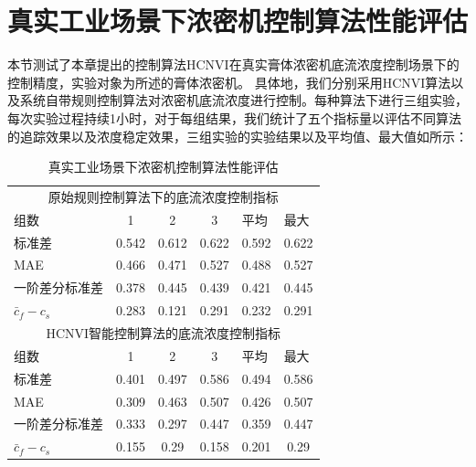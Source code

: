 \section{真实工业场景下浓密机控制算法性能评估}
本节测试了本章提出的控制算法HCNVI在真实膏体浓密机底流浓度控制场景下的控制精度，实验对象为所述的膏体浓密机。
具体地，我们分别采用HCNVI算法以及系统自带规则控制算法对浓密机底流浓度进行控制。每种算法下进行三组实验，每次实验过程持续1小时，对于每组结果，我们统计了五个指标量以评估不同算法的追踪效果以及浓度稳定效果，三组实验的实验结果以及平均值、最大值如所示：
\begin{table}[htb]
  \centering
  \caption{真实工业场景下浓密机控制算法性能评估}
    \begin{tabular}{lccccc}
    \toprule
    \multicolumn{6}{c}{原始规则控制算法下的底流浓度控制指标} \\
    \multicolumn{1}{l}{组数} & 1     & 2     & 3     & \multicolumn{1}{l}{平均} & \multicolumn{1}{l}{最大} \\
    \hline
    \multicolumn{1}{l}{标准差} & 0.542 & 0.612 & 0.622 & 0.592 & 0.622 \\
    \multicolumn{1}{l}{MAE} & 0.466 & 0.471 & 0.527 & 0.488 & 0.527 \\
    \multicolumn{1}{l}{一阶差分标准差} & 0.378 & 0.445 & 0.439 & 0.421 & 0.445 \\
    $\bar{c}_{f}-{c}_{s}$   & 0.283 & 0.121 & 0.291 & 0.232 & 0.291 \\
    \midrule
    \multicolumn{6}{c}{HCNVI智能控制算法的底流浓度控制指标} \\
    \multicolumn{1}{l}{组数} & 1     & 2     & 3     & \multicolumn{1}{l}{平均} & \multicolumn{1}{l}{最大} \\
    \hline
    \multicolumn{1}{l}{标准差} & 0.401 & 0.497 & 0.586 & 0.494 & 0.586 \\
    \multicolumn{1}{l}{MAE} & 0.309 & 0.463 & 0.507 & 0.426 & 0.507 \\
    \multicolumn{1}{l}{一阶差分标准差} & 0.333 & 0.297 & 0.447 & 0.359 & 0.447 \\
    $\bar{c}_{f}-{c}_{s}$     & 0.155 & 0.29  & 0.158 & 0.201 & 0.29 \\
    \bottomrule
    \end{tabular}%
  \label{tab:industrial_thickening_eval}%
\end{table}%
